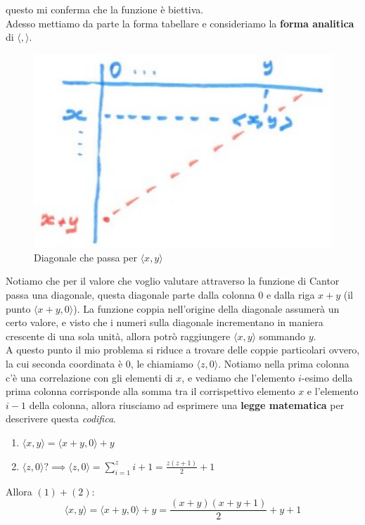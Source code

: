 \documentclass{article}
\begin{document}
questo mi conferma che la funzione è biettiva.\\Adesso mettiamo da parte la forma tabellare e
consideriamo la \textbf{forma analitica} di $\langle ,\rangle $.
\begin{figure}[H]
    \centering
    \includegraphics[scale=0.4]{images/coord_dim.png}
    \caption{Diagonale che passa per $\langle x,y\rangle $}
\end{figure}
Notiamo che per il valore che voglio valutare attraverso la funzione di Cantor passa una diagonale,
questa diagonale parte dalla colonna $0$ e dalla riga $x+y$ (il punto $\langle x+y,0\rangle $). La funzione
coppia nell'origine della diagonale assumerà un certo valore, e visto che i numeri sulla
diagonale incrementano in maniera crescente di una sola unità, allora potrò raggiungere $\langle x,y\rangle $
sommando $y$.\\A questo punto il mio problema si riduce a trovare delle coppie particolari ovvero,
la cui seconda coordinata è $0$, le chiamiamo $\langle z,0\rangle$. Notiamo nella prima colonna
c'è una correlazione con gli elementi di $x$, e vediamo che l'elemento $i$-esimo della prima
colonna corrisponde alla somma tra il corrispettivo elemento $x$ e l'elemento $i-1$ della colonna,
allora riusciamo ad esprimere una \textbf{legge matematica} per descrivere questa \textit{codifica}.
\begin{enumerate}
    \item $\langle x,y\rangle =\langle x+y,0\rangle +y$
    \item $\langle z,0\rangle ? \implies \langle z,0\rangle = \sum_{i=1}^z i+1=\frac{z(z+1)}{2}+1$
\end{enumerate}
\noindent Allora $(1)+(2)$:
$$\langle x,y\rangle = \langle x+y,0\rangle+y=\frac{(x+y)(x+y+1)}{2}+y+1$$
\end{document}
